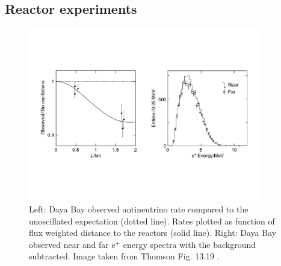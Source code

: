 \subsection{Reactor experiments}

\begin{figure}
  \centering
  \vspace{-15mm}
  \includegraphics[width=0.9\textwidth,keepaspectratio]
                {pictures/t13_19.pdf}
  \vspace*{-20mm}
  \caption{Left: Daya Bay observed antineutrino rate compared to the
           unoscillated expectation (dotted line). Rates plotted as function
           of flux weighted distance to the reactors (solid line). Right:
           Daya Bay observed near and far e$^+$ energy spectra with the
           background subtracted. Image taken from Thomson Fig. 13.19
           \cite{thomson_modern_2013}.}
  \label{fig:daya}
\end{figure}

